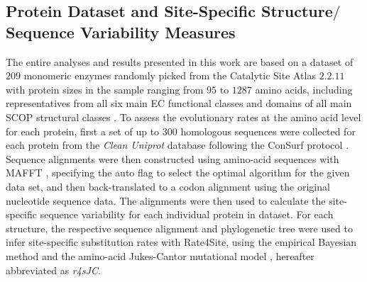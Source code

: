 \documentclass[11pt]{article}
\begin{document}


    \subsection*{Protein Dataset and Site-Specific Structure$/$Sequence Variability Measures}
    \label{sec:methods}

    The entire analyses and results presented in this work are based on a dataset of $209$ monomeric enzymes \citep[e.g.,][]{yeh_site-specific_2014, echave_relationship_2014} randomly picked from the Catalytic Site Atlas $2.2.11$ \citep[][]{porter_catalytic_2004} with protein sizes in the sample ranging from $95$ to $1287$ amino acids, including representatives from all six main EC functional classes \citep[][]{webb_enzyme_1992} and domains of all main SCOP structural classes \citep[][]{murzin_scop:_1995}. To assess the evolutionary rates at the amino acid level for each protein, first a set of up to $300$ homologous sequences were collected \citep{yeh_site-specific_2014} for each protein from the {\it Clean Uniprot} database following the ConSurf protocol \citep[][]{goldenberg_consurf-db:_2009, ashkenazy_consurf_2010}. Sequence alignments were then constructed using amino-acid sequences with MAFFT \citep[][]{katoh_mafft_2005}, specifying the auto flag to select the optimal algorithm for the given data set, and then back-translated to a codon alignment using the original nucleotide sequence data. The alignments were then used to calculate the site-specific sequence variability for each individual protein in dataset. For each structure, the respective sequence alignment and phylogenetic tree were used to infer site-specific substitution rates with Rate4Site, using the empirical Bayesian method and the amino-acid Jukes-Cantor mutational model \citep[][]{mayrose_comparison_2004}, hereafter abbreviated as {\it r4sJC}. \\
\end{document}
